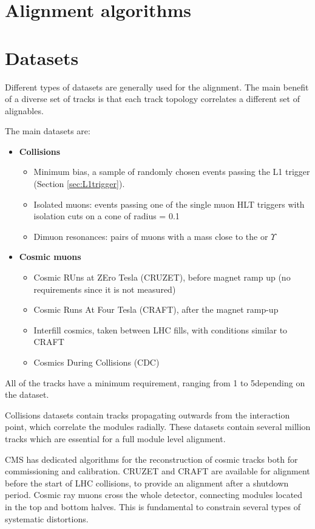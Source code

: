 \section{Alignment algorithms}

\section{Datasets}
Different types of datasets are generally used for the alignment.
The main benefit of a diverse set of tracks is that each track topology correlates a different set of alignables.

The main datasets are:
\begin{itemize}
\item \textbf{Collisions}
  \begin{itemize}
  \item Minimum bias, a sample of randomly chosen events passing the L1 trigger (Section \ref{sec:L1trigger}).
  \item Isolated muons: events passing one of the single muon HLT triggers with isolation cuts on a cone of radius \DR = 0.1
  \item Dimuon resonances: pairs of muons with a mass close to the \PZ or $\Upsilon$ %
  \end{itemize}
\item \textbf{Cosmic muons}
  \begin{itemize}
  \item Cosmic RUns at ZEro Tesla (CRUZET), before magnet ramp up (no \pt requirements since it is not measured)
  \item Cosmic Runs At Four Tesla (CRAFT), after the magnet ramp-up
  \item Interfill cosmics, taken between LHC fills, with conditions similar to CRAFT
  \item Cosmics During Collisions (CDC)
  \end{itemize}
\end{itemize}
All of the tracks have a minimum \pt requirement, ranging from 1 to 5\GeV depending on the dataset.

Collisions datasets contain tracks propagating outwards from the interaction point, which correlate the modules radially.
These datasets contain several million tracks which are essential for a full module level alignment.

CMS has dedicated algorithms for the reconstruction of cosmic tracks both for commissioning and calibration.
CRUZET and CRAFT are available for alignment before the start of LHC collisions, to provide an alignment after a shutdown period.
Cosmic ray muons cross the whole detector, connecting modules located in the top and bottom halves.
This is fundamental to constrain several types of systematic distortions.

